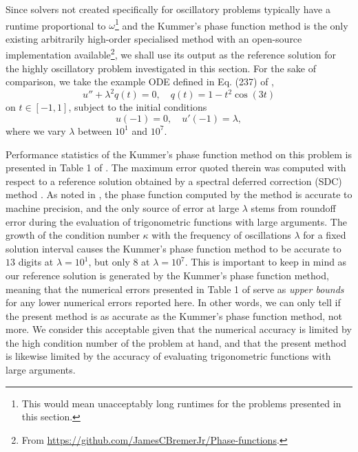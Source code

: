 \documentclass[10pt]{article}
\newcommand{\be}{\begin{equation}}
\newcommand{\ee}{\end{equation}}
\newcommand{\om}{\omega}
\begin{document}
%
Since solvers not created specifically for oscillatory problems typically have
a runtime proportional to $\om$\footnote{This would mean unacceptably long
runtimes for the problems presented in this section.} and the Kummer's phase function
method is the only existing 
arbitrarily high-order specialised method with an open-source implementation
available\footnote{From
\url{https://github.com/JamesCBremerJr/Phase-functions}.}, we shall use its
output as the reference solution for the highly oscillatory problem
investigated in this section. For the sake of comparison, we take the example
ODE defined in Eq. (237) of \cite{bremer2018},
\be\label{bremer237eq}
u'' + \lambda^2 q(t) = 0, \quad q(t) = 1 - t^2\cos(3t)
\ee
on $t \in [-1, 1]$, subject to the initial conditions
\be\label{bremer237ic}
u(-1) = 0, \quad u'(-1) = \lambda,
\ee
where we vary $\lambda$ between $10^1$ and $10^7$.

Performance statistics of the Kummer's phase function method on this problem is presented in
Table 1 of \cite{bremer2018}. The maximum error quoted therein was computed
with respect to a reference solution obtained by a spectral deferred correction
(SDC) method \cite{dutt2000}. As noted in \cite{bremer2018}, the phase function
computed by the method is accurate to machine precision, and the only source of
error at large $\lambda$ stems from roundoff error during the evaluation of
trigonometric functions with large arguments. The growth of the condition number $\kappa$ with the frequency of oscillations $\lambda$ for a fixed solution interval causes the Kummer's phase function method to
be accurate to $13$ digits at $\lambda = 10^1$, but only $8$  at $\lambda =
10^7$. This is important to keep in mind as our reference solution is generated
by the Kummer's phase function method, meaning that the numerical errors presented in Table
1 of \cite{bremer2018} serve as \emph{upper bounds} for any lower numerical
errors reported here. In other words, we can only tell if the present method is
as accurate as the Kummer's phase function method, not more. We consider this acceptable
given that the numerical accuracy is limited by the high condition number of
the problem at hand, and that the present method is likewise limited by
the accuracy of evaluating trigonometric functions with large arguments.
\end{document}
